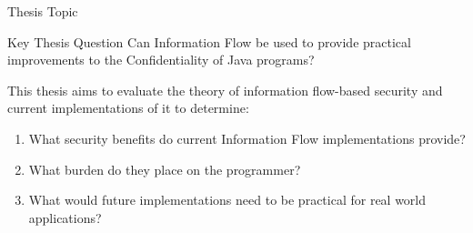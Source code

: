 \begin{frame}{Thesis Topic}
	\begin{block}{Key Thesis Question}
		Can Information Flow be used to provide practical improvements to the Confidentiality of Java programs?
	\end{block}
	
	This thesis aims to evaluate the theory of information flow-based security and current implementations of it to determine:
	
	\begin{enumerate}
		\item What security benefits do current Information Flow implementations provide?
		\item What burden do they place on the programmer?
		\item What would future implementations need to be practical for real world applications? 
	\end{enumerate}
\end{frame}